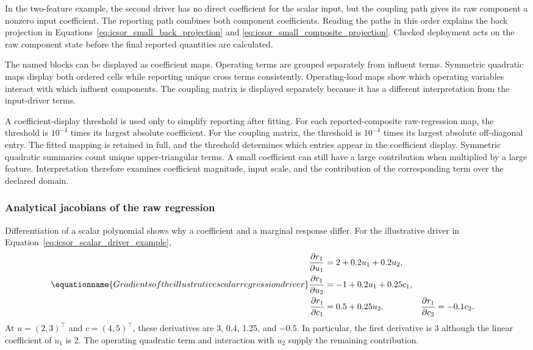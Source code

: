 In the two-feature example, the second driver has no direct coefficient for the scalar input, but the coupling path gives its raw component a nonzero input coefficient. The reporting path combines both component coefficients. Reading the paths in this order explains the back projection in Equations~\eqref{eq:icsor_small_back_projection} and \eqref{eq:icsor_small_composite_projection}. Checked deployment acts on the raw component state before the final reported quantities are calculated.

The named blocks can be displayed as coefficient maps. Operating terms are grouped separately from influent terms. Symmetric quadratic maps display both ordered cells while reporting unique cross terms consistently. Operating-load maps show which operating variables interact with which influent components. The coupling matrix is displayed separately because it has a different interpretation from the input-driver terms.

A coefficient-display threshold is used only to simplify reporting after fitting. For each reported-composite raw-regression map, the threshold is \(10^{-4}\) times its largest absolute coefficient. For the coupling matrix, the threshold is \(10^{-4}\) times its largest absolute off-diagonal entry. The fitted mapping is retained in full, and the threshold determines which entries appear in the coefficient display. Symmetric quadratic summaries count unique upper-triangular terms. A small coefficient can still have a large contribution when multiplied by a large feature. Interpretation therefore examines coefficient magnitude, input scale, and the contribution of the corresponding term over the declared domain.

\subsubsection{Analytical jacobians of the raw regression}

Differentiation of a scalar polynomial shows why a coefficient and a marginal response differ. For the illustrative driver in Equation~\eqref{eq:icsor_scalar_driver_example},
\begin{equation}
\equationname{Gradients of the illustrative scalar regression driver}
\label{eq:icsor_scalar_driver_derivatives}
\begin{aligned}
\frac{\partial r_1}{\partial u_1}&=2+0.2u_1+0.2u_2,\\
\frac{\partial r_1}{\partial u_2}&=-1+0.2u_1+0.25c_1,\\
\frac{\partial r_1}{\partial c_1}&=0.5+0.25u_2,
&\frac{\partial r_1}{\partial c_2}&=-0.1c_2.
\end{aligned}
\end{equation}
At \(u=(2,3)^\top\) and \(c=(4,5)^\top\), these derivatives are 3, 0.4, 1.25, and \(-0.5\). In particular, the first derivative is 3 although the linear coefficient of \(u_1\) is 2. The operating quadratic term and interaction with \(u_2\) supply the remaining contribution.

